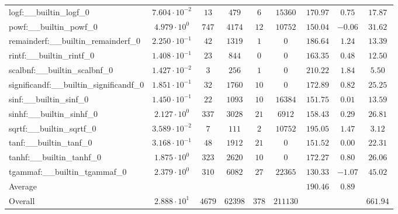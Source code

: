 \begin{tabular}{|l|c|c|c|c|c|c|c|c|}
logf:\_\_builtin\_logf\_0                 & $ 7.604 \cdot 10^{-2} $ & $ 13     $ & $ 479   $ & $ 6   $ & $ 15360  $ & $ 170.97      $ & $ 0.75    $ & $ 17.87   $ \\
powf:\_\_builtin\_powf\_0                 & $ 4.979 \cdot 10^{0}  $ & $ 747    $ & $ 4174  $ & $ 12  $ & $ 10752  $ & $ 150.04      $ & $ -0.06   $ & $ 31.62   $ \\
remainderf:\_\_builtin\_remainderf\_0     & $ 2.250 \cdot 10^{-1} $ & $ 42     $ & $ 1319  $ & $ 1   $ & $ 0      $ & $ 186.64      $ & $ 1.24    $ & $ 13.39   $ \\
rintf:\_\_builtin\_rintf\_0               & $ 1.408 \cdot 10^{-1} $ & $ 23     $ & $ 844   $ & $ 0   $ & $ 0      $ & $ 163.35      $ & $ 0.48    $ & $ 12.50   $ \\
scalbnf:\_\_builtin\_scalbnf\_0           & $ 1.427 \cdot 10^{-2} $ & $ 3      $ & $ 256   $ & $ 1   $ & $ 0      $ & $ 210.22      $ & $ 1.84    $ & $ 5.50    $ \\
significandf:\_\_builtin\_significandf\_0 & $ 1.851 \cdot 10^{-1} $ & $ 32     $ & $ 1760  $ & $ 10  $ & $ 0      $ & $ 172.89      $ & $ 0.82    $ & $ 25.25   $ \\
sinf:\_\_builtin\_sinf\_0                 & $ 1.450 \cdot 10^{-1} $ & $ 22     $ & $ 1093  $ & $ 10  $ & $ 16384  $ & $ 151.75      $ & $ 0.01    $ & $ 13.59   $ \\
sinhf:\_\_builtin\_sinhf\_0               & $ 2.127 \cdot 10^{0}  $ & $ 337    $ & $ 3028  $ & $ 21  $ & $ 6912   $ & $ 158.43      $ & $ 0.29    $ & $ 26.81   $ \\
sqrtf:\_\_builtin\_sqrtf\_0               & $ 3.589 \cdot 10^{-2} $ & $ 7      $ & $ 111   $ & $ 2   $ & $ 10752  $ & $ 195.05      $ & $ 1.47    $ & $ 3.12    $ \\
tanf:\_\_builtin\_tanf\_0                 & $ 3.168 \cdot 10^{-1} $ & $ 48     $ & $ 1912  $ & $ 21  $ & $ 0      $ & $ 151.52      $ & $ 0.00    $ & $ 22.31   $ \\
tanhf:\_\_builtin\_tanhf\_0               & $ 1.875 \cdot 10^{0}  $ & $ 323    $ & $ 2620  $ & $ 10  $ & $ 0      $ & $ 172.27      $ & $ 0.80    $ & $ 26.06   $ \\
tgammaf:\_\_builtin\_tgammaf\_0           & $ 2.379 \cdot 10^{0}  $ & $ 310    $ & $ 6082  $ & $ 27  $ & $ 22365  $ & $ 130.33      $ & $ -1.07   $ & $ 45.02   $ \\
\hline
Average                                   & $                     $ & $        $ & $       $ & $     $ & $        $ & $ 190.46      $ & $ 0.89    $ & $         $ \\
\hline
Overall                                   & $ 2.888 \cdot 10^{1}  $ & $ 4679   $ & $ 62398 $ & $ 378 $ & $ 211130 $ & $             $ & $         $ & $ 661.94  $ \\
\hline
\end{tabular}
